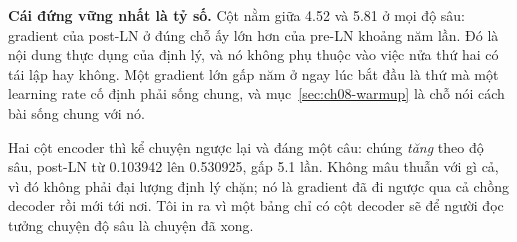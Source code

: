 \textbf{Cái đứng vững nhất là tỷ số.} Cột  nằm giữa 4.52 và 5.81
ở mọi độ sâu: gradient của post-LN ở đúng chỗ ấy lớn hơn của pre-LN khoảng năm
lần. Đó là nội dung thực dụng của định lý, và nó không phụ thuộc vào việc nửa
thứ hai có tái lập hay không. Một gradient lớn gấp năm ở ngay lúc bắt đầu là thứ
mà một learning rate cố định phải sống chung, và mục~\ref{sec:ch08-warmup} là
chỗ nói cách bài sống chung với nó.

Hai cột encoder thì kể chuyện ngược lại và đáng một câu: chúng \emph{tăng} theo
độ sâu, post-LN từ 0.103942 lên 0.530925, gấp 5.1 lần. Không mâu thuẫn với gì
cả, vì đó không phải đại lượng định lý chặn; nó là gradient đã đi ngược qua cả
chồng decoder rồi mới tới nơi. Tôi in ra vì một bảng chỉ có cột decoder sẽ để
người đọc tưởng chuyện độ sâu là chuyện đã xong.
